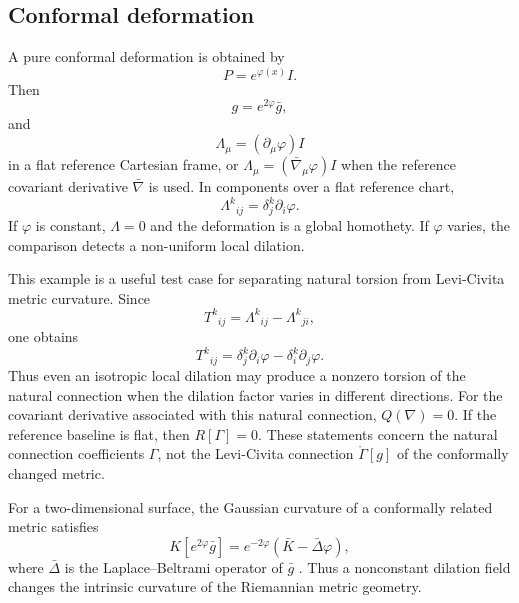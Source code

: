 \documentclass[12pt]{amsart}
\theoremstyle{definition}
\theoremstyle{remark}
\begin{document}
\subsection{Conformal deformation}\label{subsec:conformal_deformation_check}

A pure conformal deformation is obtained by
\begin{equation}
 P=e^{\varphi(x)}I .
\end{equation}
Then
\begin{equation}
 g=e^{2\varphi}\bar g,
\end{equation}
and
\begin{equation}\label{eq:conformal_DS}
 \Lambda_\mu=(\partial_\mu\varphi)I
\end{equation}
in a flat reference Cartesian frame, or $\Lambda_\mu=(\bar\nabla_\mu\varphi)I$ when the reference covariant derivative \(\bar\nabla\) is used.  In components over a flat reference chart,
\begin{equation}\label{eq:conformal_Lambda_components}
 \Lambda^k{}_{ij}=\delta^k_j\partial_i\varphi .
\end{equation}
If $\varphi$ is constant, $\Lambda=0$ and the deformation is a global homothety.  If $\varphi$ varies, the comparison detects a non-uniform local dilation.

This example is a useful test case for separating natural torsion from Levi-Civita metric curvature.  Since
\begin{equation}
 T^k{}_{ij}=\Lambda^k{}_{ij}-\Lambda^k{}_{ji},
\end{equation}
one obtains
\begin{equation}\label{eq:conformal_torsion}
 T^k{}_{ij}=\delta^k_j\partial_i\varphi-\delta^k_i\partial_j\varphi .
\end{equation}
Thus even an isotropic local dilation may produce a nonzero torsion of the natural connection when the dilation factor varies in different directions.  For the covariant derivative associated with this natural connection, \(Q(\nabla)=0\).  If the reference baseline is flat, then \(R[\Gamma]=0\).  These statements concern the natural connection coefficients \(\Gamma\), not the Levi-Civita connection \(\mathring\Gamma[g]\) of the conformally changed metric.

For a two-dimensional surface, the Gaussian curvature of a conformally related metric satisfies
\begin{equation}
 K[e^{2\varphi}\bar g]=e^{-2\varphi}\left(\bar K-\bar\Delta\varphi\right),
\end{equation}
where $\bar\Delta$ is the Laplace--Beltrami operator of $\bar g$ \cite[Thm.~7.30, p.~217]{Lee}.  Thus a nonconstant dilation field changes the intrinsic curvature of the Riemannian metric geometry.
\end{document}
